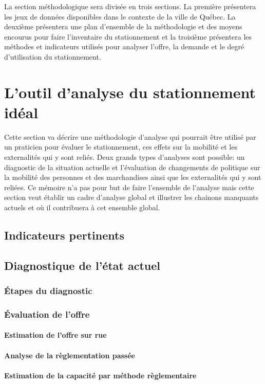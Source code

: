 \label{sec:Methodologie}
La section méthodologique sera divisée en trois sections. La première présentera les jeux de données disponibles dans le contexte de la ville de Québec. La deuxième présentera une plan d'ensemble de la méthodologie et des moyens encourus pour faire l'inventaire du stationnement et la troisième présentera les méthodes et indicateurs utilisés pour analyser l'offre, la demande et le degré d'utilisation du stationnement.
\section{L'outil d'analyse du stationnement idéal}
Cette section va décrire une méthodologie d'analyse qui pourrait être utilisé par un praticien pour évaluer le stationnement, ces effets sur la mobilité et les externalités qui y sont reliés. Deux grands types d'analyses sont possible: un diagnostic de la situation actuelle et l'évaluation de changements de politique sur la mobilité des personnes et des marchandises ainsi que les externalités qui y sont reliées. Ce mémoire n'a pas pour but de faire l'ensemble de l'analyse mais cette section veut établir un cadre d'analyse global et illustrer les chainons manquants actuels et où il contribuera à cet ensemble global.
\subsection{Indicateurs pertinents}

\subsection{Diagnostique de l'état actuel}
  \subsubsection{Étapes du diagnostic}
  \subsubsection{Évaluation de l'offre}
    \paragraph{Estimation de l'offre sur rue}
    \paragraph{Analyse de la règlementation passée}
    \paragraph{Estimation de la capacité par méthode règlementaire}
